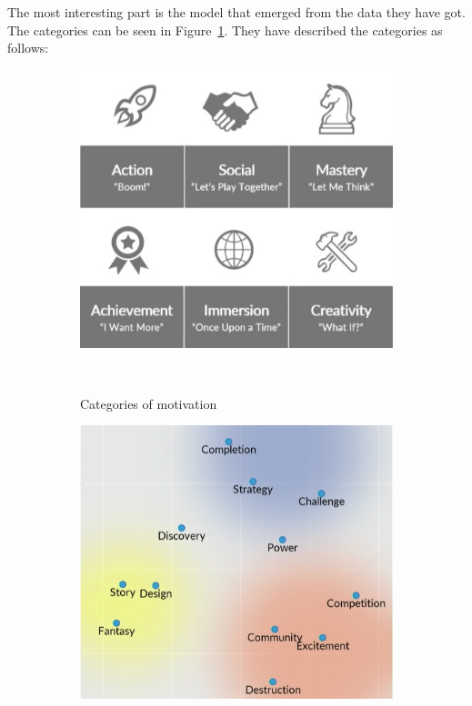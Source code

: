 The most interesting part is the model that emerged from the data they have got. The categories can be seen in Figure~\ref{fig:gameMotivation}. They have described the categories as follows:

\begin{figure}
	\centering
	\begin{subfigure}[b]{0.49\columnwidth}
		\includegraphics[width=\textwidth]{./figures/motivation}
		\caption[motivation]{Categories of motivation}~\label{fig:gameMotivation}
	\end{subfigure}
	\begin{subfigure}[b]{0.49\columnwidth}
		\includegraphics[width=\textwidth]{./figures/clusters}

\end{subfigure}
\end{figure}
